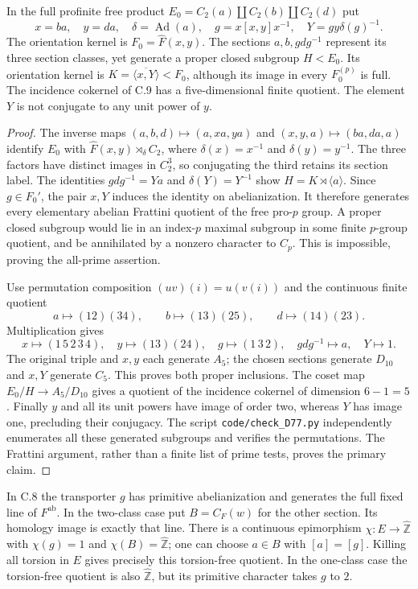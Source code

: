 In the full profinite free product
$E_0=C_2(a)\amalg C_2(b)\amalg C_2(d)$ put
\[
 x=ba,\quad y=da,\quad \delta=\operatorname{Ad}(a),\quad
 g=x[x,y]x^{-1},\quad Y=g y\delta(g)^{-1}.
\]
The orientation kernel is $F_0=\widehat F(x,y)$.
The sections $a,b,gdg^{-1}$ represent its three
section classes, yet generate a proper closed subgroup
$H<E_0$.  Its orientation kernel is
$K=\overline{\langle x,Y\rangle}<F_0$, although its
image in every $F_0^{(p)}$ is full.  The incidence
cokernel of C.9 has a five-dimensional finite quotient.
The element $Y$ is not conjugate to any unit power of $y$.

\begin{proof}
The inverse maps $(a,b,d)\mapsto(a,xa,ya)$ and
$(x,y,a)\mapsto(ba,da,a)$ identify $E_0$ with
$\widehat F(x,y)\rtimes_\delta C_2$, where
$\delta(x)=x^{-1}$ and $\delta(y)=y^{-1}$.
The three factors have distinct images in $C_2^3$,
so conjugating the third retains its section label.
The identities $gdg^{-1}=Ya$ and $\delta(Y)=Y^{-1}$
show $H=K\rtimes\langle a\rangle$.  Since $g\in F_0'$,
the pair $x,Y$ induces the identity on abelianization.
It therefore generates every elementary abelian
Frattini quotient of the free pro-$p$ group.  A
proper closed subgroup would lie in an index-$p$
maximal subgroup in some finite $p$-group quotient,
and be annihilated by a nonzero character to $C_p$.
This is impossible, proving the all-prime assertion.

Use permutation composition $(uv)(i)=u(v(i))$ and
the continuous finite quotient
\[
 a\mapsto(12)(34),\qquad b\mapsto(13)(25),\qquad
 d\mapsto(14)(23).
\]
Multiplication gives
\[
 x\mapsto(1\,5\,2\,3\,4),\quad y\mapsto(13)(24),\quad
 g\mapsto(1\,3\,2),\quad gdg^{-1}\mapsto a,\quad Y\mapsto1.
\]
The original triple and $x,y$ each generate $A_5$;
the chosen sections generate $D_{10}$ and $x,Y$
generate $C_5$.  This proves both proper inclusions.
The coset map $E_0/H\to A_5/D_{10}$ gives a quotient
of the incidence cokernel of dimension $6-1=5$.
Finally $y$ and all its unit powers have image of
order two, whereas $Y$ has image one, precluding
their conjugacy.  The script
\texttt{code/check\_D77.py} independently enumerates
all these generated subgroups and verifies the
permutations.  The Frattini argument, rather than
a finite list of prime tests, proves the primary claim.
\end{proof}

In C.8 the transporter $g$ has primitive abelianization
and generates the full fixed line of $F^{\mathrm{ab}}$.
In the two-class case put $B=C_F(w)$ for the other
section.  Its homology image is exactly that line.
There is a continuous epimorphism
$\chi:E\to\widehat{\mathbb Z}$ with $\chi(g)=1$ and
$\chi(B)=\widehat{\mathbb Z}$; one can choose
$a\in B$ with $[a]=[g]$.  Killing all torsion in
$E$ gives precisely this torsion-free quotient.
In the one-class case the torsion-free quotient
is also $\widehat{\mathbb Z}$, but its primitive
character takes $g$ to $2$.

